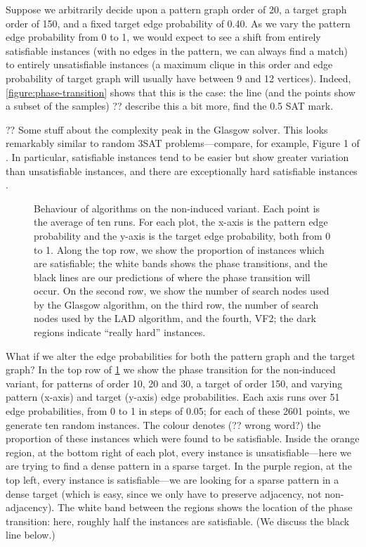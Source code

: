 \documentclass[letterpaper]{article}
\begin{document}
Suppose we arbitrarily decide upon a pattern graph order of 20, a target graph order of 150, and a
fixed target edge probability of 0.40. As we vary the pattern edge probability from 0 to 1, we would
expect to see a shift from entirely satisfiable instances (with no edges in the pattern, we can
always find a match) to entirely unsatisfiable instances (a maximum clique in this order and edge
probability of target graph will usually have between 9 and 12 vertices). Indeed,
\cref{figure:phase-transition} shows that this is the case: the line (and the points show a subset
of the samples) ?? describe this a bit more, find the 0.5 SAT mark.

?? Some stuff about the complexity peak in the Glasgow solver. This looks remarkably similar to random
3SAT problems---compare, for example, Figure 1 of \citet{LeytonBrown:2014}. In particular,
satisfiable instances tend to be easier but show greater variation than unsatisfiable instances, and
there are exceptionally hard satisfiable instances \citep{Smith:1997}.

\begin{figure}[tb]
    
    \caption{Behaviour of algorithms on the non-induced variant. Each point is the average of ten
        runs. For each plot, the x-axis is the pattern edge probability and the y-axis is the target
        edge probability, both from 0 to 1. Along the top row, we show the proportion of instances which are
        satisfiable; the white bands shows the phase transitions, and the black lines are our
        predictions of where the phase transition will occur. On the second row, we show the number
    of search nodes used by the Glasgow algorithm, on the third row, the number of search nodes used
by the LAD algorithm, and the fourth, VF2; the dark regions indicate ``really hard'' instances.}
    \label{figure:non-induced}
\end{figure}

What if we alter the edge probabilities for both the pattern graph and the target graph?  In the top
row of \cref{figure:non-induced} we show the phase transition for the non-induced variant, for
patterns of order 10, 20 and 30, a target of order 150, and varying pattern (x-axis) and target
(y-axis) edge probabilities. Each axis runs over 51 edge probabilities, from 0 to 1 in steps of
0.05; for each of these 2601 points, we generate ten random instances. The colour denotes (?? wrong
word?) the proportion of these instances which were found to be satisfiable.  Inside the orange
region, at the bottom right of each plot, every instance is unsatisfiable---here we are trying to
find a dense pattern in a sparse target. In the purple region, at the top left, every instance is
satisfiable---we are looking for a sparse pattern in a dense target (which is easy, since we only
have to preserve adjacency, not non-adjacency). The white band between the regions shows the
location of the phase transition: here, roughly half the instances are satisfiable. (We discuss the
black line below.)
\end{document}
